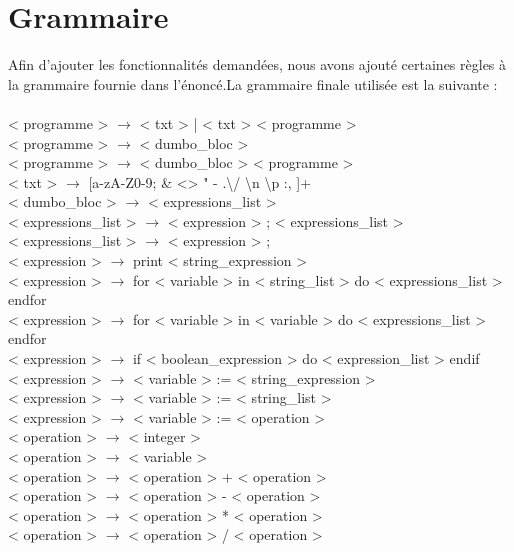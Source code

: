 \documentclass[a4paper,10pt]{article}
\begin{document}
\section{Grammaire}
Afin d'ajouter les fonctionnalités demandées, nous avons ajouté certaines règles à la grammaire fournie dans l'énoncé.\newline La grammaire finale utilisée est la suivante : \\ \\
{\small
< programme > $\rightarrow$ < txt > | < txt > < programme >\\
< programme > $\rightarrow$ < dumbo\_bloc > \\
< programme > $\rightarrow$ < dumbo\_bloc > < programme > \\
< txt > $\rightarrow$ [a-zA-Z0-9; \& <> " - .\textbackslash / \textbackslash n \textbackslash p :, ]+ \\
< dumbo\_bloc > $\rightarrow$ {{ < expressions\_list > }} \\
< expressions\_list > $\rightarrow$ < expression > ; < expressions\_list >\\
< expressions\_list > $\rightarrow$ < expression > ; \\
< expression > $\rightarrow$ print < string\_expression > \\
< expression > $\rightarrow$ for < variable > in < string\_list > do < expressions\_list > endfor \\
< expression > $\rightarrow$ for < variable > in < variable > do < expressions\_list > endfor \\
< expression > $\rightarrow$ if < boolean\_expression > do < expression\_list > endif\\
< expression > $\rightarrow$ < variable > := < string\_expression > \\
< expression > $\rightarrow$ < variable > := < string\_list > \\
< expression > $\rightarrow$ < variable > := < operation > \\
< operation > $\rightarrow$ < integer > \\
< operation > $\rightarrow$ < variable > \\
< operation > $\rightarrow$ < operation > + < operation >\\
< operation > $\rightarrow$ < operation > - < operation >\\
< operation > $\rightarrow$ < operation > * < operation >\\
< operation > $\rightarrow$ < operation > / < operation >\\
}
\end{document}
